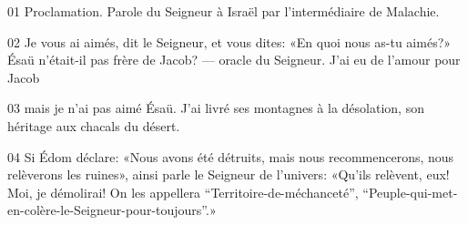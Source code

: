 01 Proclamation. Parole du Seigneur à Israël par l’intermédiaire de Malachie.

02 Je vous ai aimés, dit le Seigneur, et vous dites: «En quoi nous as-tu aimés?» Ésaü n’était-il pas frère de Jacob? --- oracle du Seigneur. J’ai eu de l’amour pour Jacob

03 mais je n’ai pas aimé Ésaü. J’ai livré ses montagnes à la désolation, son héritage aux chacals du désert.

04 Si Édom déclare: «Nous avons été détruits, mais nous recommencerons, nous relèverons les ruines», ainsi parle le Seigneur de l’univers: «Qu’ils relèvent, eux! Moi, je démolirai! On les appellera “Territoire-de-méchanceté”, “Peuple-qui-met-en-colère-le-Seigneur-pour-toujours”.»
